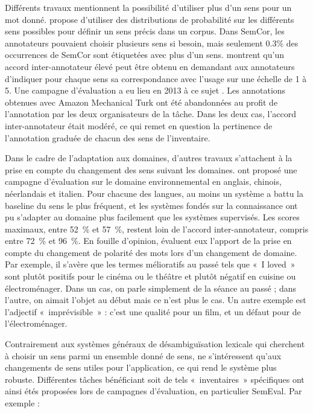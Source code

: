 Différents travaux mentionnent la possibilité d'utiliser plus d'un sens pour un
mot donné. \cite{smith2011rumble} propose d'utiliser des distributions de
probabilité sur les différents sens possibles pour définir un sens précis dans
un corpus. Dans SemCor, les annotateurs pouvaient choisir plusieurs sens si
besoin, mais seulement 0.3\% des occurrences de SemCor sont étiquetées avec
plus d'un sens. \cite{erk2013measuring} montrent qu'un accord inter-annotateur
élevé peut être obtenu en demandant aux annotateurs d'indiquer pour chaque sens
sa correspondance avec l'usage sur une échelle de 1 à 5. Une campagne
d'évaluation a eu lieu en 2013 à ce sujet \citep{jurgens2013semeval}. Les
annotations obtenues avec Amazon Mechanical Turk ont été abandonnées au profit
de l'annotation par les deux organisateurs de la tâche. Dans les deux cas,
l'accord inter-annotateur était modéré, ce qui remet en question la pertinence
de l'annotation graduée de chacun des sens de l'inventaire.

Dans le cadre de l'adaptation aux domaines, d'autres travaux s'attachent à la
prise en compte du changement des sens suivant les domaines.
\cite{agirre2010semeval17} ont proposé une campagne d'évaluation sur le domaine
environnemental en anglais, chinois, néerlandais et italien. Pour chacune des
langues, au moins un système a battu la baseline du sens le plus fréquent, et
les systèmes fondés sur la connaissance ont pu s'adapter au domaine plus
facilement que les systèmes supervisés. Les scores maximaux, entre 52~\% et
57~\%, restent loin de l'accord inter-annotateur, compris entre 72~\% et 96~\%.
En fouille d'opinion, \cite{marchand2014influence} évaluent eux l'apport de la
prise en compte du changement de polarité des mots lors d'un changement de
domaine. Par exemple, il s'avère que les termes mélioratifs au passé tels que
«~I loved~» sont plutôt positifs pour le cinéma ou le théâtre et plutôt négatif
en cuisine ou électroménager. Dans un cas, on parle simplement de la séance au
passé ; dans l'autre, on aimait l'objet au début mais ce n'est plus le cas. Un
autre exemple est l'adjectif «~imprévisible~» : c'est une qualité pour un film,
et un défaut pour de l'électroménager.

Contrairement aux systèmes généraux de désambiguïsation lexicale qui cherchent
à choisir un sens parmi un ensemble donné de sens, \cite{marchand2014influence}
ne s'intéressent qu'aux changements de sens utiles pour l'application, ce qui
rend le système plus robuste. Différentes tâches bénéficiant soit de tels
«~inventaires~» spécifiques ont ainsi étés proposées lors de campagnes
d'évaluation, en particulier SemEval. Par exemple :

